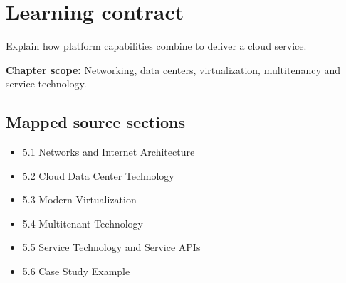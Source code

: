 \documentclass[10pt,letterpaper]{article}
\begin{document}
\sourceStatement
\tableofcontents
\newpage
\section{Learning contract}
\begin{takeaway}
Explain how platform capabilities combine to deliver a cloud service.
\end{takeaway}
\textbf{Chapter scope:} Networking, data centers, virtualization, multitenancy and service technology.\\
\subsection{Mapped source sections}
\begin{itemize}
\item 5.1 Networks and Internet Architecture
\item 5.2 Cloud Data Center Technology
\item 5.3 Modern Virtualization
\item 5.4 Multitenant Technology
\item 5.5 Service Technology and Service APIs
\item 5.6 Case Study Example
\end{itemize}
\end{document}
